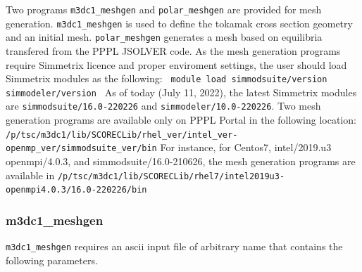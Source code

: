 Two programs \texttt{m3dc1\_meshgen} and \texttt{polar\_meshgen} are provided for mesh generation. \texttt{m3dc1\_meshgen} is used to define the tokamak cross section geometry and an initial mesh.  \texttt{polar\_meshgen} generates a mesh based on equilibria transfered from the PPPL JSOLVER code. As the mesh generation programs require Simmetrix licence and proper enviroment settings, the user should load Simmetrix modules as the following:
\newline\newline
\texttt{
module load simmodsuite/version simmodeler/version
}
\newline\newline
As of today (July 11, 2022), the latest Simmetrix modules are \texttt{simmodsuite/16.0-220226} and \texttt{simmodeler/10.0-220226}.
\newline\newline
Two mesh generation programs are available only on PPPL Portal in the following location:
\newline\newline
\texttt{/p/tsc/m3dc1/lib/SCORECLib/rhel\_ver/intel\_ver-openmp\_ver/simmodsuite\_ver/bin}
\newline\newline
For instance, for Centos7, intel/2019.u3 openmpi/4.0.3, and simmodsuite/16.0-210626, the mesh generation programs are available in 
\newline\newline
\texttt{/p/tsc/m3dc1/lib/SCORECLib/rhel7/intel2019u3-openmpi4.0.3/16.0-220226/bin}


\subsubsection{m3dc1\_meshgen}
\texttt{m3dc1\_meshgen} requires an ascii input file of arbitrary name that contains the following parameters.

